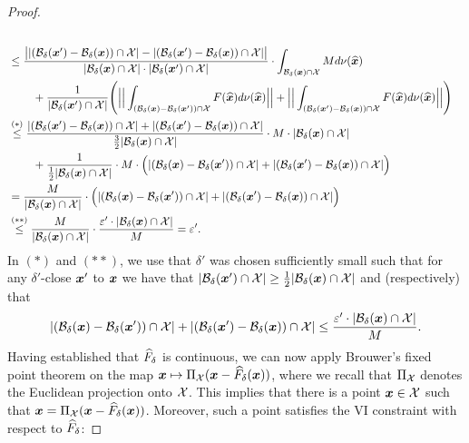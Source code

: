 \begin{proof}
\begin{align}
        \\
        &\leq \frac{ \big| | \qty( {\mathcal{B}}_{\delta}({\bm{x}}') - {\mathcal{B}}_{\delta}({\bm{x}}) ) \cap {\mathcal{X}}| - | \qty( {\mathcal{B}}_{\delta}({\bm{x}}') - {\mathcal{B}}_{\delta}({\bm{x}}) ) \cap {\mathcal{X}}| \big| }{|{\mathcal{B}}_{\delta}({\bm{x}}) \cap {\mathcal{X}}| \cdot |{\mathcal{B}}_{\delta}({\bm{x}}') \cap {\mathcal{X}}|} \cdot \int_{{\mathcal{B}}_{\delta}({\bm{x}}) \cap {\mathcal{X}}} M d\nu(\widehat{{\bm{x}}})
        \\
        &\, \quad \quad + \frac{1}{|{\mathcal{B}}_{\delta}({\bm{x}}') \cap {\mathcal{X}}|} \qty( \Big|\Big| \int_{({\mathcal{B}}_{\delta}({\bm{x}}) - {\mathcal{B}}_{\delta}({\bm{x}}')) \cap {\mathcal{X}}} F(\widehat{{\bm{x}}}) d\nu(\widehat{{\bm{x}}}) \Big|\Big| + \Big|\Big| \int_{({\mathcal{B}}_{\delta}({\bm{x}}') - {\mathcal{B}}_{\delta}({\bm{x}})) \cap {\mathcal{X}}} F(\widehat{{\bm{x}}}) d\nu(\widehat{{\bm{x}}}) \Big|\Big| )
        \\
        &\overset{(*)}{\leq} \frac{| \qty( {\mathcal{B}}_{\delta}({\bm{x}}') - {\mathcal{B}}_{\delta}({\bm{x}}) ) \cap {\mathcal{X}}| + | \qty( {\mathcal{B}}_{\delta}({\bm{x}}') - {\mathcal{B}}_{\delta}({\bm{x}}) ) \cap {\mathcal{X}}|}{ \frac{3}{2}|{\mathcal{B}}_{\delta}({\bm{x}}) \cap {\mathcal{X}}|} \cdot  M \cdot  |{\mathcal{B}}_{\delta}({\bm{x}}) \cap {\mathcal{X}}|
        \\
        &\, \quad \quad + \frac{1}{\frac{1}{2}|{\mathcal{B}}_{\delta}({\bm{x}}) \cap {\mathcal{X}}|} \cdot M \cdot \Big( |({\mathcal{B}}_{\delta}({\bm{x}}) - {\mathcal{B}}_{\delta}({\bm{x}}')) \cap {\mathcal{X}}| + |({\mathcal{B}}_{\delta}({\bm{x}}') - {\mathcal{B}}_{\delta}({\bm{x}})) \cap {\mathcal{X}}| \Big)
        \\
        &= \frac{M}{|{\mathcal{B}}_{\delta}({\bm{x}}) \cap {\mathcal{X}}|} \cdot \Big( |({\mathcal{B}}_{\delta}({\bm{x}}) - {\mathcal{B}}_{\delta}({\bm{x}}')) \cap {\mathcal{X}}| + |({\mathcal{B}}_{\delta}({\bm{x}}') - {\mathcal{B}}_{\delta}({\bm{x}})) \cap {\mathcal{X}}| \Big)
        \\
        &\overset{(**)}{\leq} \frac{M}{|{\mathcal{B}}_{\delta}({\bm{x}}) \cap {\mathcal{X}}|} \cdot \frac{\varepsilon' \cdot |{\mathcal{B}}_{\delta}({\bm{x}}) \cap {\mathcal{X}}|}{M} = \varepsilon'.
    \end{align}
    In $(*)$ and $(**)$, we use that $\delta'$ was chosen sufficiently small such that for any $\delta'$-close ${\bm{x}}'$ to ${\bm{x}}$ we have that $|{\mathcal{B}}_{\delta}({\bm{x}}') \cap {\mathcal{X}}| \geq \frac{1}{2}|{\mathcal{B}}_{\delta}({\bm{x}}) \cap {\mathcal{X}}|$ and (respectively) that
    \[
        |({\mathcal{B}}_{\delta}({\bm{x}}) - {\mathcal{B}}_{\delta}({\bm{x}}')) \cap {\mathcal{X}}| + |({\mathcal{B}}_{\delta}({\bm{x}}') - {\mathcal{B}}_{\delta}({\bm{x}})) \cap {\mathcal{X}}| \leq \frac{\varepsilon' \cdot |{\mathcal{B}}_{\delta}({\bm{x}}) \cap {\mathcal{X}}|}{M}.
    \]
    \fi
    Having established that $\widehat{F}_\delta$ is continuous, we can now apply Brouwer's fixed point theorem on the map ${\bm{x}} \mapsto \Pi_{\mathcal{X}} ( {\bm{x}} - \widehat{F}_{\delta}({\bm{x}}))$, where we recall that $\Pi_{\mathcal{X}}$ denotes the Euclidean projection onto ${\mathcal{X}}$. This implies that there is a point ${\bm{x}} \in {\mathcal{X}}$ such that ${\bm{x}} = \Pi_{\mathcal{X}} ( {\bm{x}} - \widehat{F}_{\delta}({\bm{x}}))$. Moreover, such a point satisfies the VI constraint with respect to $\widehat{F}_\delta$:

\end{proof}
